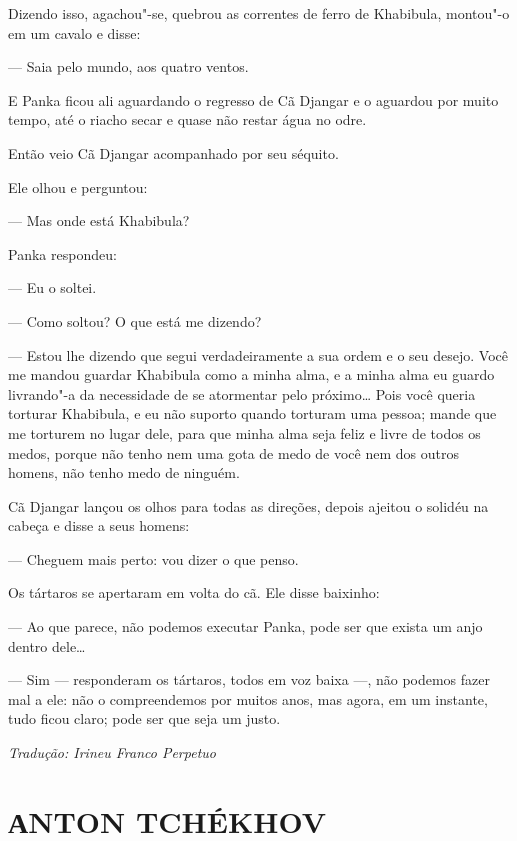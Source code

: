 Dizendo isso, agachou"-se, quebrou as correntes de ferro de Khabibula,
montou"-o em um cavalo e disse:

--- Saia pelo mundo, aos quatro ventos.

E Panka ficou ali aguardando o regresso de Cã Djangar e o aguardou por
muito tempo, até o riacho secar e quase não restar água no odre.

Então veio Cã Djangar acompanhado por seu séquito.

Ele olhou e perguntou:

--- Mas onde está Khabibula?

Panka respondeu:

--- Eu o soltei.

--- Como soltou? O que está me dizendo?

--- Estou lhe dizendo que segui verdadeiramente a sua ordem e o seu
desejo. Você me mandou guardar Khabibula como a minha alma, e a minha
alma eu guardo livrando"-a da necessidade de se atormentar pelo
próximo\ldots{} Pois você queria torturar Khabibula, e eu não suporto quando
torturam uma pessoa; mande que me torturem no lugar dele, para
que minha alma seja feliz e livre de todos os medos, porque não tenho
nem uma gota de medo de você nem dos outros homens, não tenho medo de
ninguém.

Cã Djangar lançou os olhos para todas as direções, depois ajeitou
o solidéu na cabeça e disse a seus homens:

--- Cheguem mais perto: vou dizer o que penso.

Os tártaros se apertaram em volta do cã. Ele disse baixinho:

--- Ao que parece, não podemos executar Panka, pode ser que exista um
anjo dentro dele\ldots{}

--- Sim --- responderam os tártaros, todos em voz baixa ---, não podemos
fazer mal a ele: não o compreendemos por muitos anos, mas agora, em um
instante, tudo ficou claro; pode ser que seja um justo.

\medskip

{\footnotesize\hfill\emph{Tradução: Irineu Franco Perpetuo}}




\part[АNTON TCHÉKHOV]{АNTON TCHÉKHOV }

